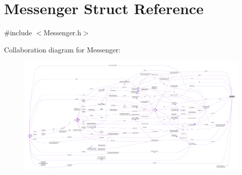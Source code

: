 \hypertarget{struct_messenger}{\section{Messenger Struct Reference}
\label{struct_messenger}
}


{\ttfamily \#include $<$Messenger.\+h$>$}



Collaboration diagram for Messenger\+:
\nopagebreak
\begin{figure}[H]
\begin{center}
\leavevmode
\includegraphics[width=350pt]{d4/d92/struct_messenger__coll__graph}
\end{center}
\end{figure}
